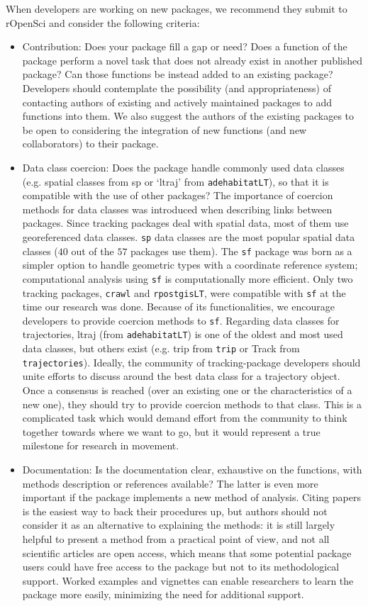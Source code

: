 \documentclass[a4paper,12pt]{article}
\newcommand{\Rpkg}[1]{\texttt{#1}}
\begin{document}
	When developers are working on new packages, we recommend they submit to rOpenSci and consider the following criteria:
	\begin{itemize}
		\item Contribution: Does your package fill a gap or need? Does a function of the package perform a novel task that does not already exist in another published package? Can those functions be instead added to an existing package? Developers should contemplate the possibility (and appropriateness) of contacting authors of existing and actively maintained packages to add functions into them. We also suggest the authors of the existing packages to be open to considering the integration of new functions (and new collaborators) to their package.
		\item Data class coercion: Does the package handle commonly used data classes (e.g. spatial classes from sp or `ltraj' from \Rpkg{adehabitatLT}), so that it is compatible with the use of other packages? The importance of coercion methods for data classes was introduced when describing links between packages. Since tracking packages deal with spatial data, most of them use georeferenced data classes. \Rpkg{sp} data classes \citep{Pebesma2005,Bivand2013} are the most popular spatial data classes ($40$ out of the $57$ packages use them). The \Rpkg{sf} package \citep{Pebesma2018} was born as a simpler option to handle geometric types with a coordinate reference system; computational analysis using \Rpkg{sf} is computationally more efficient. Only two tracking packages, \Rpkg{crawl} and \Rpkg{rpostgisLT}, were compatible with \Rpkg{sf} at the time our research was done. Because of its functionalities, we encourage developers to provide coercion methods to \Rpkg{sf}. Regarding data classes for trajectories, ltraj (from \Rpkg{adehabitatLT}) is one of the oldest and most used data classes, but others exist (e.g. trip from \Rpkg{trip} or Track from \Rpkg{trajectories}). Ideally, the community of tracking-package developers should unite efforts to discuss around the best data class for a trajectory object. Once a consensus is reached (over an existing one or the characteristics of a new one), they should try to provide coercion methods to that class. This is a complicated task which would demand effort from the community to think together towards where we want to go, but it would represent a true milestone for research in movement. 	
		\item Documentation: Is the documentation clear, exhaustive on the functions, with methods description or references available? The latter is even more important if the package implements a new method of analysis. Citing papers is the easiest way to back their procedures up, but authors should not consider it as an alternative to explaining the methods: it is still largely helpful to present a method from a practical point of view, and not all scientific articles are open access, which means that some potential package users could have free access to the package but not to its methodological support. Worked examples and vignettes can enable researchers to learn the package more easily, minimizing the need for additional support.

\end{itemize}
\end{document}
